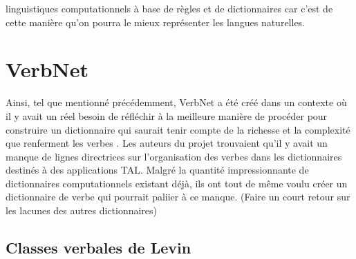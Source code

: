 linguistiques computationnels à base de règles et de dictionnaires car c'est de cette manière qu'on pourra le mieux représenter les langues naturelles.


\section{VerbNet}

Ainsi, tel que mentionné précédemment, VerbNet a été créé dans un contexte où il y avait un réel besoin de réfléchir à la meilleure manière de procéder pour construire un dictionnaire qui saurait tenir compte de la richesse et la complexité que renferment les verbes \citep{KipperClassBasedConstructionVerb2000}. Les auteurs du projet trouvaient qu'il y avait un manque de lignes directrices sur l'organisation des verbes dans les dictionnaires destinés à des applications TAL. Malgré la quantité impressionnante de dictionnaires computationnels existant déjà, ils ont tout de même voulu créer un dictionnaire de verbe qui pourrait paliier à ce manque. (Faire un court retour sur les lacunes des autres dictionnaires)

\subsection{Classes verbales de Levin}

